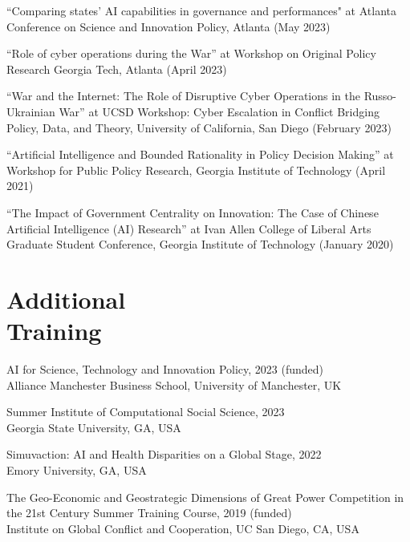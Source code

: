 \documentclass[margin,line, 10pt]{res}
\begin{document}
\begin{resume}
“Comparing states’ AI capabilities in governance and performances" at Atlanta Conference on Science and Innovation Policy, Atlanta (May 2023)
\vspace{-.1cm}

“Role of cyber operations during the War” at Workshop on Original Policy Research Georgia Tech, Atlanta (April 2023)
\vspace{-.1cm}

“War and the Internet: The Role of Disruptive Cyber Operations in the Russo-Ukrainian War” at UCSD Workshop: Cyber Escalation in Conflict Bridging Policy, Data, and Theory, University of California, San Diego (February 2023)
\vspace{-.1cm}

“Artificial Intelligence and Bounded Rationality in Policy Decision Making” at Workshop for Public Policy Research, Georgia Institute of Technology (April 2021)
\vspace{-.1cm}

“The Impact of Government Centrality on Innovation: The Case of Chinese Artificial Intelligence (AI) Research” at Ivan Allen College of Liberal Arts Graduate Student Conference, Georgia Institute of Technology (January 2020)
\vspace{-.1cm}


\section{\sc Additional\\Training}
AI for Science, Technology and Innovation Policy, 2023 (funded)\\
Alliance Manchester Business School, University of Manchester, UK

Summer Institute of Computational Social Science, 2023\\
Georgia State University, GA, USA

Simuvaction: AI and Health Disparities on a Global Stage, 2022\\
Emory University, GA, USA

The Geo-Economic and Geostrategic Dimensions of Great Power Competition in the 21st 
Century Summer Training Course, 2019 (funded)\\
Institute on Global Conflict and Cooperation, UC San Diego, CA, USA


\end{resume}
\end{document}
